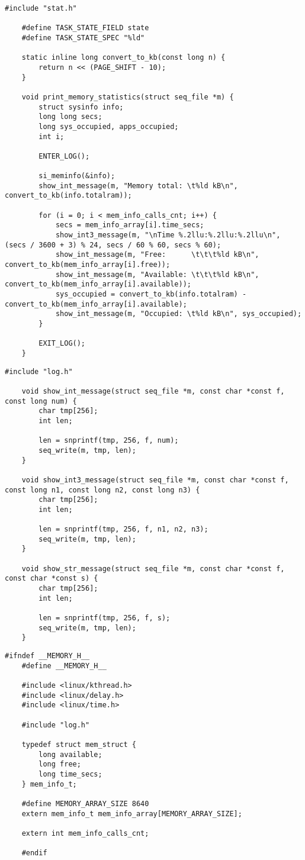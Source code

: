 \begin{lstlisting}[caption={листинг файла stat.c}]
	#include "stat.h"
	
	#define TASK_STATE_FIELD state
	#define TASK_STATE_SPEC "%ld"
	
	static inline long convert_to_kb(const long n) {
		return n << (PAGE_SHIFT - 10);
	}
	
	void print_memory_statistics(struct seq_file *m) {
		struct sysinfo info;
		long long secs;
		long sys_occupied, apps_occupied;
		int i;
		
		ENTER_LOG();
		
		si_meminfo(&info);
		show_int_message(m, "Memory total: \t%ld kB\n", convert_to_kb(info.totalram));
		
		for (i = 0; i < mem_info_calls_cnt; i++) {
			secs = mem_info_array[i].time_secs;
			show_int3_message(m, "\nTime %.2llu:%.2llu:%.2llu\n", (secs / 3600 + 3) % 24, secs / 60 % 60, secs % 60);
			show_int_message(m, "Free:      \t\t\t%ld kB\n", convert_to_kb(mem_info_array[i].free));
			show_int_message(m, "Available: \t\t\t%ld kB\n", convert_to_kb(mem_info_array[i].available));
			sys_occupied = convert_to_kb(info.totalram) - convert_to_kb(mem_info_array[i].available);
			show_int_message(m, "Occupied: \t%ld kB\n", sys_occupied);
		}
		
		EXIT_LOG();
	}
\end{lstlisting}

\newpage

\begin{lstlisting}[caption={листинг файла log.c}]
	#include "log.h"
	
	void show_int_message(struct seq_file *m, const char *const f, const long num) {
		char tmp[256];
		int len;
		
		len = snprintf(tmp, 256, f, num);
		seq_write(m, tmp, len);
	}
	
	void show_int3_message(struct seq_file *m, const char *const f, const long n1, const long n2, const long n3) {
		char tmp[256];
		int len;
		
		len = snprintf(tmp, 256, f, n1, n2, n3);
		seq_write(m, tmp, len);
	}
	
	void show_str_message(struct seq_file *m, const char *const f, const char *const s) {
		char tmp[256];
		int len;
		
		len = snprintf(tmp, 256, f, s);
		seq_write(m, tmp, len);
	}
\end{lstlisting}

\begin{lstlisting}[caption={листинг файла memory.h}]
	#ifndef __MEMORY_H__
	#define __MEMORY_H__
	
	#include <linux/kthread.h>
	#include <linux/delay.h>
	#include <linux/time.h>
	
	#include "log.h"
	
	typedef struct mem_struct {
		long available;
		long free;
		long time_secs;
	} mem_info_t;
	
	#define MEMORY_ARRAY_SIZE 8640
	extern mem_info_t mem_info_array[MEMORY_ARRAY_SIZE];
	
	extern int mem_info_calls_cnt;
	
	#endif
\end{lstlisting}
